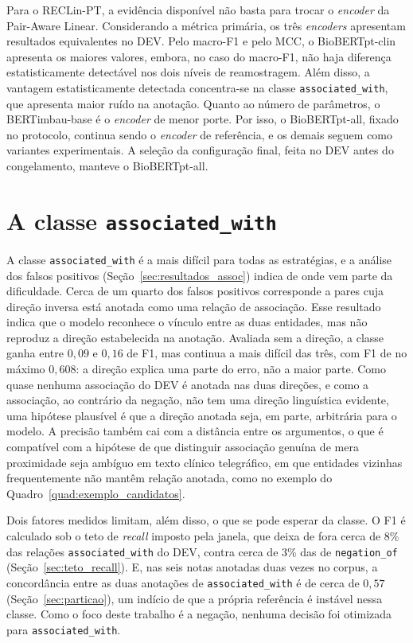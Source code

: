 Para o RECLin-PT, a evidência disponível não basta para trocar o \emph{encoder} da
Pair-Aware Linear. Considerando a métrica primária, os três \emph{encoders} apresentam resultados equivalentes no DEV. Pelo macro-F1 e pelo MCC, o BioBERTpt-clin apresenta os maiores valores, embora, no caso do macro-F1, não haja diferença estatisticamente detectável nos dois níveis de reamostragem. Além disso, a vantagem estatisticamente detectada concentra-se na classe \texttt{associated\_with}, que apresenta maior ruído na anotação. Quanto ao número de parâmetros, o BERTimbau-base é o \emph{encoder} de menor porte. Por isso, o BioBERTpt-all, fixado no protocolo, continua
sendo o \emph{encoder} de referência, e os demais seguem como variantes
experimentais. A seleção da configuração final, feita no DEV antes do
congelamento, manteve o BioBERTpt-all.

\section{A classe \texttt{associated\_with}}

A classe \texttt{associated\_with} é a mais difícil para todas as estratégias, e a
análise dos falsos positivos (Seção~\ref{sec:resultados_assoc}) indica de onde vem
parte da dificuldade. Cerca de um quarto dos falsos positivos corresponde a pares cuja direção inversa está anotada como uma relação de associação. Esse resultado indica que o modelo reconhece o vínculo entre as duas entidades, mas não reproduz a direção estabelecida na anotação. Avaliada sem a direção, a classe ganha entre $0{,}09$ e $0{,}16$ de F1, mas continua a mais difícil das três, com F1 de no máximo $0{,}608$: a direção explica uma parte do erro, não a maior parte. Como quase nenhuma associação do
DEV é anotada nas duas direções, e como a associação, ao contrário da negação, não
tem uma direção linguística evidente, uma hipótese plausível é que a direção anotada
seja, em parte, arbitrária para o modelo. A precisão também cai com a distância entre
os argumentos, o que é compatível com a hipótese de que distinguir associação
genuína de mera proximidade seja ambíguo em texto clínico telegráfico, em que
entidades vizinhas frequentemente não mantêm relação anotada, como no exemplo do
Quadro~\ref{quad:exemplo_candidatos}.

Dois fatores medidos limitam, além disso, o que se pode esperar da classe. O F1 é
calculado sob o teto de \emph{recall} imposto pela janela, que deixa de fora cerca de
8\% das relações \texttt{associated\_with} do DEV, contra cerca de 3\% das de
\texttt{negation\_of} (Seção~\ref{sec:teto_recall}). E, nas seis notas anotadas duas
vezes no corpus, a concordância entre as duas anotações de \texttt{associated\_with} é
de cerca de $0{,}57$ (Seção~\ref{sec:particao}), um indício de que a própria
referência é instável nessa classe. Como o foco deste trabalho é a negação, nenhuma
decisão foi otimizada para \texttt{associated\_with}.

